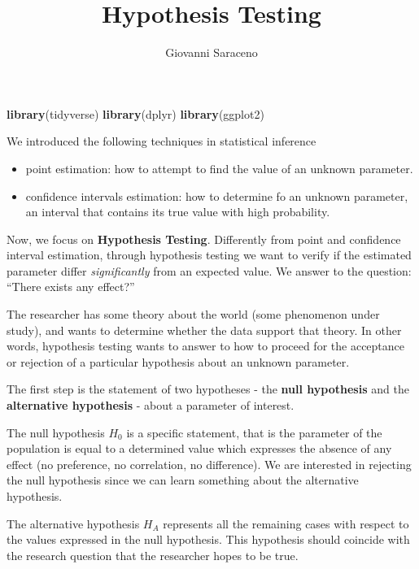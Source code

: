 \documentclass[
]{article}
\title{Hypothesis Testing}
\author{Giovanni Saraceno}
\date{}
\newenvironment{Shaded}{\begin{snugshade}}{\end{snugshade}}
\newcommand{\FunctionTok}[1]{\textcolor[rgb]{0.13,0.29,0.53}{\textbf{#1}}}
\newcommand{\NormalTok}[1]{#1}
\providecommand{\tightlist}{%
  \setlength{\itemsep}{0pt}\setlength{\parskip}{0pt}}
\begin{document}
\maketitle

{
\setcounter{tocdepth}{2}
\tableofcontents
}
\begin{Shaded}
\begin{Highlighting}[]
\FunctionTok{library}\NormalTok{(tidyverse)}
\FunctionTok{library}\NormalTok{(dplyr)}
\FunctionTok{library}\NormalTok{(ggplot2)}
\end{Highlighting}
\end{Shaded}

We introduced the following techniques in statistical inference

\begin{itemize}
\tightlist
\item
  point estimation: how to attempt to find the value of an unknown
  parameter.
\item
  confidence intervals estimation: how to determine fo an unknown
  parameter, an interval that contains its true value with high
  probability.
\end{itemize}

Now, we focus on \textbf{Hypothesis Testing}. Differently from point and
confidence interval estimation, through hypothesis testing we want to
verify if the estimated parameter differ \emph{significantly} from an
expected value. We answer to the question: ``There exists any effect?''

The researcher has some theory about the world (some phenomenon under
study), and wants to determine whether the data support that theory. In
other words, hypothesis testing wants to answer to how to proceed for
the acceptance or rejection of a particular hypothesis about an unknown
parameter.

The first step is the statement of two hypotheses - the \textbf{null
hypothesis} and the \textbf{alternative hypothesis} - about a parameter
of interest.

The null hypothesis \(H_0\) is a specific statement, that is the
parameter of the population is equal to a determined value which
expresses the absence of any effect (no preference, no correlation, no
difference). We are interested in rejecting the null hypothesis since we
can learn something about the alternative hypothesis.

The alternative hypothesis \(H_A\) represents all the remaining cases
with respect to the values expressed in the null hypothesis. This
hypothesis should coincide with the research question that the
researcher hopes to be true.
\end{document}
